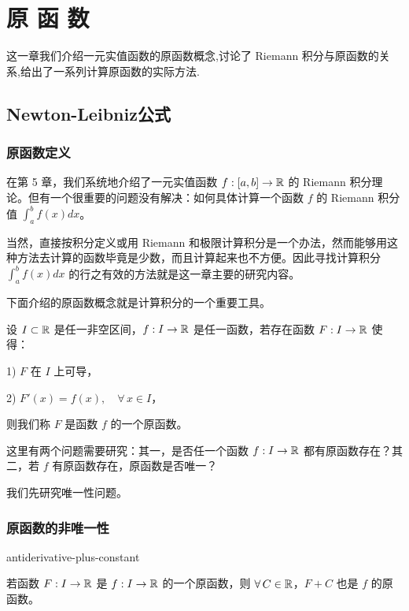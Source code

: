 \chapter{原 函 数}

这一章我们介绍一元实值函数的原函数概念,讨论了 Riemann 积分与原函数的关系,给出了一系列计算原函数的实际方法.

\section{Newton-Leibniz公式}

\subsection{原函数定义}
	\label{sec:7-1-1}

在第 5 章，我们系统地介绍了一元实值函数 \(f:[a,b]\to\mathbb{R}\) 的 Riemann 积分理论。但有一个很重要的问题没有解决：如何具体计算一个函数 \(f\) 的 Riemann 积分值 \(\displaystyle\int_a^b f(x)dx\)。

当然，直接按积分定义或用 Riemann 和极限计算积分是一个办法，然而能够用这种方法去计算的函数毕竟是少数，而且计算起来也不方便。因此寻找计算积分 \(\displaystyle\int_a^b f(x)dx\) 的行之有效的方法就是这一章主要的研究内容。

下面介绍的原函数概念就是计算积分的一个重要工具。

\begin{mydef*}{}

	设 \(I\subset\mathbb{R}\) 是任一非空区间，\(f:I\to\mathbb{R}\) 是任一函数，若存在函数 \(F:I\to\mathbb{R}\) 使得：

	1) \(F\) 在 \(I\) 上可导，

	2) \(F'(x)=f(x),\quad\forall\,x\in I\)，

	则我们称 \(F\) 是函数 \(f\) 的一个原函数。

\end{mydef*}

这里有两个问题需要研究：其一，是否任一个函数 \(f:I\to\mathbb{R}\) 都有原函数存在？其二，若 \(f\) 有原函数存在，原函数是否唯一？

我们先研究唯一性问题。

\subsection{原函数的非唯一性}
	\label{sec:7-1-2}

\begin{mythm}{}{antiderivative-plus-constant}

	若函数 \(F:I\to\mathbb{R}\) 是 \(f:I\to\mathbb{R}\) 的一个原函数，则 \(\forall\,C\in\mathbb{R}\)，\(F+C\) 也是 \(f\) 的原函数。

\end{mythm}

